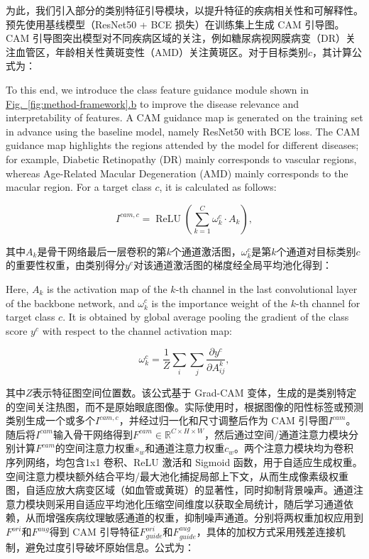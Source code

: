 为此，我们引入部分的类别特征引导模块，以提升特征的疾病相关性和可解释性。预先使用基线模型（ResNet50 + BCE 损失）在训练集上生成 CAM 引导图。CAM 引导图突出模型对不同疾病区域的关注，例如糖尿病视网膜病变（DR）关注血管区，年龄相关性黄斑变性（AMD）关注黄斑区。对于目标类别\(c\)，其计算公式为：

To this end, we introduce the class feature guidance module shown in \hyperref[fig:method-framework]{Fig.~\ref*{fig:method-framework}.b} to improve the disease relevance and interpretability of features. A CAM guidance map is generated on the training set in advance using the baseline model, namely ResNet50 with BCE loss. The CAM guidance map highlights the regions attended by the model for different diseases; for example, Diabetic Retinopathy (DR) mainly corresponds to vascular regions, whereas Age-Related Macular Degeneration (AMD) mainly corresponds to the macular region. For a target class \(c\), it is calculated as follows:

\begin{equation}\label{eq:cam}
I^{cam,c} = \operatorname{ReLU}\left(\sum_{k = 1}^{C}\omega_{k}^{c} \cdot A_{k}\right),
\end{equation}

其中\(A_{k}\)是骨干网络最后一层卷积的第\(k\)个通道激活图，\(\omega_{k}^{c}\)是第\(k\)个通道对目标类别\(c\)的重要性权重，由类别得分\(y^{c}\)对该通道激活图的梯度经全局平均池化得到：

Here, \(A_{k}\) is the activation map of the \(k\)-th channel in the last convolutional layer of the backbone network, and \(\omega_{k}^{c}\) is the importance weight of the \(k\)-th channel for target class \(c\). It is obtained by global average pooling the gradient of the class score \(y^{c}\) with respect to the channel activation map:

\begin{equation}\label{eq:cam-weight}
\omega_{k}^{c} = \frac{1}{Z}\sum_i\sum_j \frac{\partial y^{c}}{\partial A_{ij}^{k}},
\end{equation}

其中\(Z\)表示特征图空间位置数。该公式基于 Grad-CAM 变体，生成的是类别特定的空间关注热图，而不是原始眼底图像。实际使用时，根据图像的阳性标签或预测类别生成一个或多个\(I^{cam,c}\)，并经过归一化和尺寸调整后作为 CAM 引导图\(I^{cam}\)。随后将\(I^{cam}\)输入骨干网络得到\(F^{cam} \in \mathbb{R}^{C \times H \times W}\)，然后通过空间/通道注意力模块分别计算\(F^{cam}\)的空间注意力权重\(s_{w}\)和通道注意力权重\(c_{w}\)。两个注意力模块均为卷积序列网络，均包含1x1 卷积、ReLU 激活和 Sigmoid 函数，用于自适应生成权重。空间注意力模块额外结合平均/最大池化捕捉局部上下文，从而生成像素级权重图，自适应放大病变区域（如血管或黄斑）的显著性，同时抑制背景噪声。通道注意力模块则采用自适应平均池化压缩空间维度以获取全局统计，随后学习通道依赖，从而增强疾病纹理敏感通道的权重，抑制噪声通道。分别将两权重加权应用到\(F^{ori}\)和\(F^{aug}\)得到 CAM 引导特征\(F_{guide}^{ori}\)和\(F_{guide}^{aug}\)，具体的加权方式采用残差连接机制，避免过度引导破坏原始信息。公式为：

